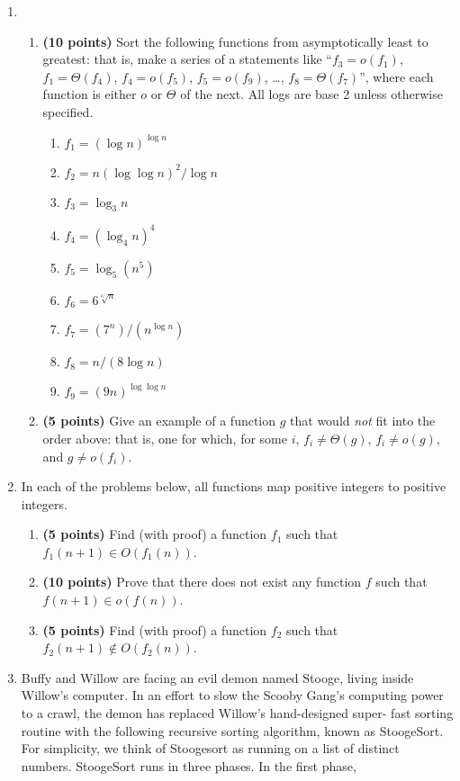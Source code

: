 \documentclass[11pt]{article}
\begin{document}
\begin{enumerate}
\item
\begin{enumerate}
\item
{\bf (10 points)}
Sort the following functions from asymptotically least to greatest: 
that is, make a series of a statements like 
``$f_3 = o(f_1)$, $f_1 = \Theta(f_4)$, $f_4 = o(f_5)$, $f_5 = o(f_9)$, \ldots, $f_8 = \Theta(f_7)$'', 
where each function is either $o$ or $\Theta$ of the next.
All logs are base 2 unless otherwise specified.
\begin{enumerate}
\item $f_1 = (\log n)^{\log n}$
\item $f_2 = n (\log \log n)^2 / \log n$
\item $f_3 = \log_3 n$
\item $f_4 = (\log_4 n)^4$
\item $f_5 = \log_{5}(n^5)$
\item $f_6 = 6^{\sqrt[6]{n}}$
\item $f_7 = (7^n)/(n^{\log n})$
\item $f_8 = n/(8\log n)$
\item $f_9 = (9n)^{\log \log n}$
\end{enumerate}
\item
{\bf (5 points)}
Give an example of a function $g$ that would \emph{not} fit into the order above: that is, one for which, for some $i$, $f_i \not = \Theta(g)$, $f_i \not = o(g)$, and $g \not = o(f_i)$.
\end{enumerate}
\item
In each of the problems below, all functions map positive integers to positive integers.
\begin{enumerate}
\item
{\bf (5 points)}
Find (with proof) a function $f_1$ such that $f_1(n+1) \in O(f_1(n))$.
\item
{\bf (10 points)}
Prove that there does not exist any function $f$ such that $f(n+1) \in o(f(n))$.
\item
{\bf (5 points)}
Find (with proof) a function $f_2$ such that $f_2(n+1) \not \in O(f_2(n))$.
\end{enumerate}
\item
Buffy and Willow are facing an evil demon named Stooge, living inside Willow's computer. In an effort to
slow the Scooby Gang's computing power to a crawl, the demon has replaced Willow's hand-designed super-
fast sorting routine with the following recursive sorting algorithm, known as StoogeSort. For simplicity, we
think of Stoogesort as running on a list of distinct numbers. StoogeSort runs in three phases. In the first phase,

\end{enumerate}
\end{document}
